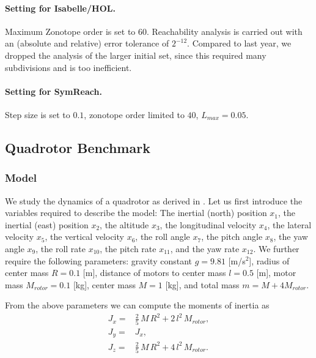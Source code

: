\documentclass[EPiC]{easychair}
\begin{document}
\paragraph{Setting for Isabelle/HOL.}
Maximum Zonotope order is set to $60$. Reachability analysis is carried out with an (absolute and relative) error tolerance of $2^{-12}$. Compared to last year, we dropped the analysis of the larger initial set, since this required many subdivisions and is too inefficient.

\paragraph{Setting for SymReach.}
Step size is set to $0.1$, zonotope order limited to $40$, $L_{max} = 0.05$. 



\subsection{Quadrotor Benchmark}

\subsubsection{Model}

We study the dynamics of a quadrotor as derived in \cite[eq. (16) - (19)]{Beard2008}. Let us first introduce the variables required to describe the model: The inertial (north) position $x_1$, the inertial (east) position $x_2$, the altitude $x_3$, the longitudinal velocity $x_4$, the lateral velocity $x_5$, the vertical velocity $x_6$, the roll angle $x_7$, the pitch angle $x_8$, the yaw angle $x_9$, the roll rate $x_{10}$, the pitch rate $x_{11}$, and the yaw rate $x_{12}$. We further require the following parameters: gravity constant $g = 9.81$ [m/s$^2$], radius of center mass $R = 0.1$ [m], distance of motors to center mass $l = 0.5$ [m], motor mass $M_{rotor} = 0.1$ [kg], center mass $M = 1$ [kg], and total mass $m = M + 4M_{rotor}$.

From the above parameters we can compute the moments of inertia as 
\begin{equation*}
\begin{split}
J_x =& \frac{2}{5} \, M \, R^2 + 2 \, l^2 \, M_{rotor}, \\
J_y =& J_x, \\
J_z =& \frac{2}{5} \, M \, R^2 + 4 \, l^2 \, M_{rotor}.
\end{split}
\end{equation*}
\end{document}
